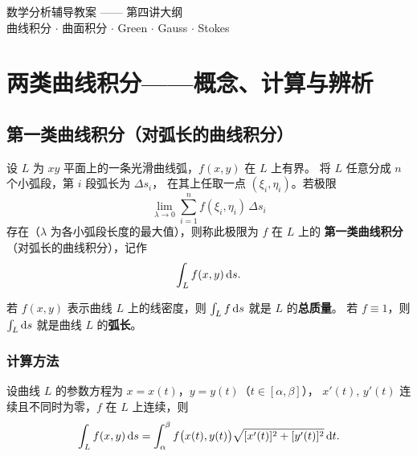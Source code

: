 \documentclass{article}
\newcommand{\course}{数学分析辅导教案}
\newcommand{\hwNum}{4}
\begin{document}
\pagestyle{fancy}
\fancyhead{}
\lhead{\course\ 第\hwNum\ 讲}
\rhead{\today}


\begin{center}
  {\Large 数学分析辅导教案 —— 第四讲大纲} \\[6pt]
  {\large 曲线积分 $\cdot$ 曲面积分 $\cdot$ Green $\cdot$ Gauss $\cdot$ Stokes}
\end{center}

\tableofcontents
\newpage

\section{两类曲线积分——概念、计算与辨析}

\subsection{第一类曲线积分（对弧长的曲线积分）}

\begin{definition}[第一类曲线积分]
  设 $L$ 为 $xy$ 平面上的一条光滑曲线弧，$f(x,y)$ 在 $L$ 上有界。
  将 $L$ 任意分成 $n$ 个小弧段，第 $i$ 段弧长为 $\Delta s_i$，
  在其上任取一点 $(\xi_i, \eta_i)$。若极限
  \[
    \lim_{\lambda \to 0} \sum_{i=1}^{n} f(\xi_i, \eta_i) \,\Delta s_i
  \]
  存在（$\lambda$ 为各小弧段长度的最大值），则称此极限为 $f$ 在 $L$ 上的
  \textbf{第一类曲线积分}（对弧长的曲线积分），记作
  \[
    \int_L f(x,y) \,\mathrm{d} s.
  \]
\end{definition}

\begin{remark}[物理意义]
  若 $f(x,y)$ 表示曲线 $L$ 上的线密度，则 $\int_L f \,\mathrm{d} s$ 就是 $L$ 的\textbf{总质量}。
  若 $f \equiv 1$，则 $\int_L \mathrm{d} s$ 就是曲线 $L$ 的\textbf{弧长}。
\end{remark}

\subsubsection*{计算方法}

\begin{theorem}
  设曲线 $L$ 的参数方程为 $x = x(t)$，$y = y(t)$（$t \in [\alpha, \beta]$），
  $x'(t)$, $y'(t)$ 连续且不同时为零，$f$ 在 $L$ 上连续，则
  \[
    \int_L f(x,y) \,\mathrm{d} s
    = \int_\alpha^\beta f\bigl(x(t), y(t)\bigr) \sqrt{[x'(t)]^2 +
    [y'(t)]^2} \,\mathrm{d} t.
  \]
\end{theorem}
\end{document}
